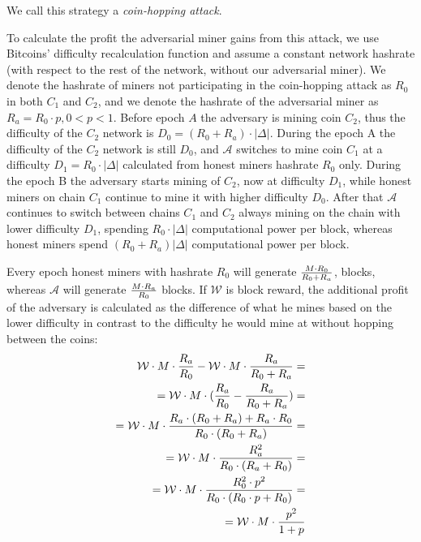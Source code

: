 \documentclass[]{llncs}
\newcommand{\texp}{|\Delta|}
\newcommand{\reward}{\mathcal{W}}
\newcommand{\attackname}{coin-hopping attack}
\newcommand{\coinA}{$C_1$}
\newcommand{\coinB}{$C_2$}
\begin{document}
We call this strategy a \textit{\attackname}.

To calculate the profit the adversarial miner gains from this attack, we use Bitcoins' difficulty recalculation function and assume a  constant network hashrate (with respect to the rest of the network, without our adversarial miner).
We denote the hashrate of miners not participating in the coin-hopping attack as $R_0$ in both \coinA{} and \coinB{}, and we denote the hashrate of the adversarial miner as $R_a=R_0\cdot p, 0 < p < 1 $.
Before epoch $A$ the adversary is mining coin \coinB{}, thus the difficulty of the \coinB{} network  is $D_0 = (R_0+R_a) \cdot \texp$.
During the epoch A the difficulty of the \coinB{} network is still $D_0$, and $\mathcal{A}$ switches to mine coin \coinA{} at a difficulty $D_1 = R_0 \cdot \texp$  calculated from honest miners hashrate $R_0$ only.
During the epoch B the adversary starts mining of \coinB{}, now at difficulty $D_1$, while honest miners on chain \coinA{} continue to mine it with higher difficulty $D_0$.
After that $\mathcal{A}$ continues to switch between chains \coinA{} and \coinB{} always mining on the chain with lower difficulty $D_1$, spending $R_0 \cdot \texp$ computational power per block, whereas honest miners spend $(R_0+R_a) \texp$ computational power per block.

Every epoch honest miners with hashrate $R_0$ will generate $M \cdot R_0 \over R_0 + R_a$, blocks, whereas $\mathcal{A}$ will generate $M \cdot R_a \over R_0$ blocks.
If $\reward$ is block reward, the additional profit of the adversary is calculated as the difference of what he mines based on the lower difficulty in contrast to the difficulty he would mine at without hopping between the coins:
\begin{equation}
\begin{aligned}
{\reward \cdot M \cdot { R_a \over R_0} - \reward \cdot M \cdot { R_a \over R_0 + R_a}} = \\
= {\reward \cdot M \cdot ( { R_a \over R_0} - {R_a \over R_0 + R_a})} = \\
= {\reward \cdot M \cdot { R_a \cdot (R_0 + R_a) + R_a \cdot R_0 \over R_0 \cdot (R_0 + R_a) }} = \\
= {\reward \cdot M \cdot { R_a^2 \over R_0 \cdot (R_a + R_0) }} = \\
= {\reward \cdot M \cdot {R_0^2 \cdot p^2 \over R_0 \cdot (R_0 \cdot p + R_0)}} = \\
= {\reward \cdot M \cdot { p^2 \over 1+p }}
\end{aligned}
\end{equation}
\end{document}
